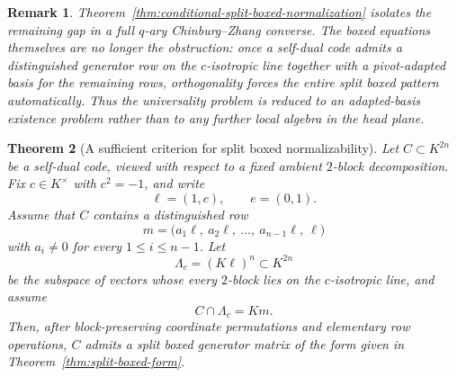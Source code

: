 \documentclass[12pt]{article}
\newtheorem{theorem}{Theorem}[section]
\newtheorem{remark}[theorem]{Remark}
\begin{document}
\begin{remark}
\rm
Theorem~\ref{thm:conditional-split-boxed-normalization} isolates the remaining gap in a full \(q\)-ary Chinburg--Zhang converse. The boxed equations themselves are no longer the obstruction: once a self-dual code admits a distinguished generator row on the \(c\)-isotropic line together with a pivot-adapted basis for the remaining rows, orthogonality forces the entire split boxed pattern automatically. Thus the universality problem is reduced to an adapted-basis existence problem rather than to any further local algebra in the head plane.
\end{remark}

\begin{theorem}[A sufficient criterion for split boxed normalizability]
\label{thm:sufficient-boxed-normalizability}
Let \(C\subset K^{2n}\) be a self-dual code, viewed with respect to a fixed ambient \(2\)-block decomposition. Fix \(c\in K^\times\) with \(c^2=-1\), and write
\[
\ell=(1,c),\qquad e=(0,1).
\]
Assume that \(C\) contains a distinguished row
\[
m=\bigl(a_1\ell,\ a_2\ell,\ \dots,\ a_{n-1}\ell,\ \ell\bigr)
\]
with \(a_i\neq 0\) for every \(1\le i\le n-1\). Let
\[
\Lambda_c=(K\ell)^n\subset K^{2n}
\]
be the subspace of vectors whose every \(2\)-block lies on the \(c\)-isotropic line, and assume
\[
C\cap \Lambda_c = K m.
\]
Then, after block-preserving coordinate permutations and elementary row operations, \(C\) admits a split boxed generator matrix of the form given in Theorem~\ref{thm:split-boxed-form}.
\end{theorem}
\end{document}
